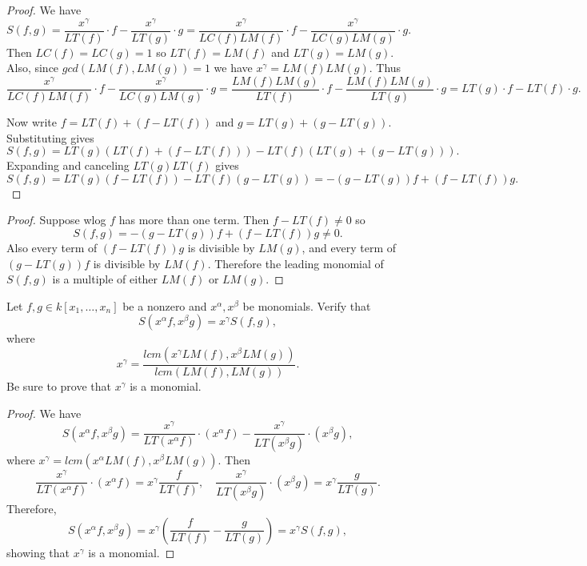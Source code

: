 \begin{proof}
    We have 
    \[S(f, g) 
        = \frac{x^\gamma}{LT(f)} \cdot f - \frac{x^\gamma}{LT(g)} \cdot g 
        = \frac{x^\gamma}{LC(f) LM(f)} \cdot f - \frac{x^\gamma}{LC(g) LM(g)} \cdot g.\]
    Then $LC(f) = LC(g) = 1$ so $LT(f) = LM(f)$ and $LT(g) = LM(g)$. Also, since 
        $gcd(LM(f), LM(g)) = 1$ we have $x^\gamma = LM(f) LM(g)$. 
    Thus 
    \[\frac{x^\gamma}{LC(f) LM(f)} \cdot f - \frac{x^\gamma}{LC(g) LM(g)} \cdot g 
        = \frac{LM(f) LM(g)}{LT(f)} \cdot f - \frac{LM(f) LM(g)}{LT(g)} \cdot g = LT(g) \cdot f - LT(f) \cdot g.\]

    Now write $f = LT(f) + (f - LT(f))$ and $g = LT(g) + (g - LT(g))$. Substituting gives
    \[
    S(f,g) = LT(g)(LT(f) + (f-LT(f))) - LT(f)(LT(g) + (g-LT(g))).
    \]
    Expanding and canceling $LT(g)LT(f)$ gives
    \[
    S(f,g) = LT(g)(f-LT(f)) - LT(f)(g-LT(g))
           = -(g-LT(g))f + (f-LT(f))g.
    \]
\end{proof}

\begin{proof}
    Suppose wlog $f$ has more than one term.
    Then $f - LT(f) \ne 0$ so 
    \[
    S(f,g) = -(g-LT(g))f + (f-LT(f))g \ne 0.
    \]
    Also every term of $(f-LT(f))g$ is divisible by $LM(g)$, 
        and every term of $(g-LT(g))f$ is divisible by $LM(f)$.
    Therefore the leading monomial of $S(f,g)$ is a multiple of either $LM(f)$ or $LM(g)$.
\end{proof}


\begin{tcolorbox}[title=Problem 12, breakable]
    Let $f, g \in k[x_1, \ldots, x_n]$ be a nonzero and $x^\alpha, x^\beta$ be monomials.
    Verify that 
    \[S(x^\alpha f, x^\beta g) = x^\gamma S(f, g),\]
    where 
    \[x^\gamma = \frac{lcm(x^\gamma LM(f), x^\beta LM(g))}{lcm(LM(f), LM(g))}.\]
    Be sure to prove that $x^\gamma$ is a monomial. 
\end{tcolorbox}

\begin{proof}
    We have 
    \[
        S(x^\alpha f, x^\beta g) = \frac{x^\gamma}{LT(x^\alpha f)} \cdot (x^\alpha f) - \frac{x^\gamma}{LT(x^\beta g)} \cdot (x^\beta g),
    \]
    where $x^\gamma = lcm(x^\alpha LM(f), x^\beta LM(g))$.  
    Then 
    \[
        \frac{x^\gamma}{LT(x^\alpha f)} \cdot (x^\alpha f) = x^\gamma \frac{f}{LT(f)}, \quad 
        \frac{x^\gamma}{LT(x^\beta g)} \cdot (x^\beta g) = x^\gamma \frac{g}{LT(g)}.
    \]
    Therefore,
    \[
        S(x^\alpha f, x^\beta g) = x^\gamma \left(\frac{f}{LT(f)} - \frac{g}{LT(g)}\right) = x^\gamma S(f, g),
    \]
    showing that $x^\gamma$ is a monomial.  
\end{proof}


